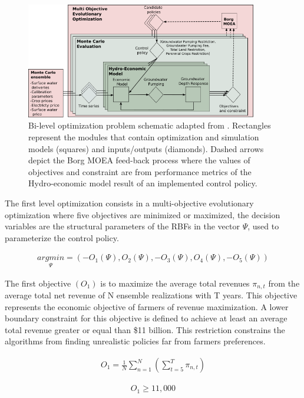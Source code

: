\documentclass[11pt,a4paper]{article}
\begin{document}
\begin{figure}[H]
    \centering
    \includegraphics[width=0.9\textwidth]{Diagram2}
    \caption{Bi-level optimization problem schematic adapted from \textcite{hamilton_stream_2022}. Rectangles represent the modules that contain optimization and simulation models (squares) and inputs/outputs (diamonds). Dashed arrows depict the Borg MOEA feed-back process where the values of objectives and constraint are from performance metrics of the Hydro-economic model  result of an implemented control policy.}
    \label{fig:m1esh1}
\end{figure}

The first level optimization consists in a multi-objective evolutionary optimization where five objectives are minimized or maximized, the decision variables are the structural parameters of the RBFs in the vector $\Psi$, used to parameterize the control policy. 

\begin{align}
\underset{\Psi}{argmin} = (-O_{1}(\Psi),O_{2}(\Psi),-O_{3}(\Psi),O_{4}(\Psi),-O_{5}(\Psi))
\end{align}

The first objective $(O_{1})$ is to maximize the average total revenues $\pi_{n,t}$  from the average total net revenue of N ensemble realizations with T years. This objective represents the economic objective of farmers of revenue maximization. A lower boundary constraint for this objective is defined to achieve at least an average total revenue greater or equal than \$11 billion. This restriction constrains the algorithms from finding unrealistic policies far from farmers preferences. 

\begin{align}
O_{1} = \frac{1}{N}\sum_{n=1}^N(\sum_{t=5}^T \pi_{n,t})
\end{align}


\begin{align}
O_{1} \geq 11,000
\end{align}
\end{document}
